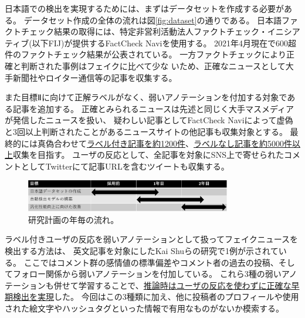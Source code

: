 
\vspace{20pt}
日本語での検出を実現するためには、まずはデータセットを作成する必要がある。
データセット作成の全体の流れは図\ref{fig:dataset}の通りである。
日本語ファクトチェック結果の取得には、特定非営利活動法人ファクトチェック・イニシアティブ(以下FIJ)が提供するFactCheck Naviを使用する。
2021年4月現在で600超件のファクトチェック結果が公表されている。%
一方ファクトチェックにより正確と判断された事例はフェイクに比べて少な%
いため、正確なニュースとして大手新聞社やロイター通信等の記事を収集する。

また目標Ⅱに向けて正解ラベルがなく、弱いアノテーションを付加する対象である記事を追加する。
正確とみられるニュースは先述と同じく大手マスメディアが発信したニュースを扱い、
疑わしい記事としてFactCheck Naviによって虚偽と3回以上判断されたことがあるニュースサイトの他記事も収集対象とする。
最終的には真偽合わせて\underline{ラベル付き記事を約1200件}、\underline{ラベルなし記事を約5000件以上}収集を目指す。
ユーザの反応として、全記事を対象にSNS上で寄せられたコメントとしてTwitterにて記事URLを含むツイートも収集する。

\setlength\intextsep{0pt}
\setlength\textfloatsep{0pt}
\begin{figure}
    \vspace{-5mm}
    \centering
    \includegraphics[width=0.8\textwidth]{figs/plan.pdf}
    \vspace{-1cm} 
    \caption{研究計画の年毎の流れ。}
    \label{fig:plan}
\end{figure}
ラベル付きユーザの反応を弱いアノテーションとして扱ってフェイクニュースを検出する方法は、
英文記事を対象にしたKai Shuらの研究で1例が示されている\cite{shu2020leveraging}。
ここではコメント群の感情値の標準偏差やコメント者の過去の投稿、そしてフォロー関係から弱いアノテーションを付加している。
これら3種の弱いアノテーションも併せて学習することで、\underline{推論時はユーザの反応を使わずに正確な早期検出を実現}した。
今回はこの3種類に加え、他に投稿者のプロフィールや使用された絵文字やハッシュタグといった情報で有用なものがないか模索する。

